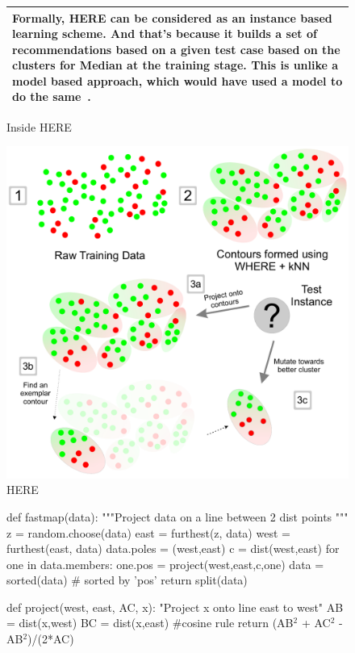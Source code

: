 \documentclass[conference]{IEEEtran}
\begin{document}
{\begin{figure}[htbp!]
\begin{tabular}{|p{.95\linewidth}|}
Formally, HERE can be considered as an instance based  learning scheme. And that's because it builds a set of recommendations based on a given test case based on the clusters for Median at the training stage. This is unlike a model based approach, which would have used a model to do the same~\cite{xomo}.
\\\hline
\end{tabular}
\caption{Inside HERE}\label{fig:what}
\end{figure}

\begin{figure}
\centering
\includegraphics[width=\linewidth]{_figs/WHAT-Clusters2.pdf}
\caption{HERE}
\label{fig:whatflow}
\end{figure}

\begin{figure}[!b]
\begin{python}[left]
def fastmap(data): 
  """Project data on a line 
     between 2 dist points
  """
  z          = random.choose(data)
  east       = furthest(z, data)
  west       = furthest(east, data)
  data.poles = (west,east)
  c          = dist(west,east)     
  for one in data.members: 
    one.pos = project(west,east,c,one)
  data = sorted(data) # sorted by 'pos'
  return split(data)

def project(west, east, AC, x): 
  "Project x onto line east to west"
  AB = dist(x,west)
  BC = dist(x,east)
  #cosine rule
  return (AB$^2$ + AC$^2$ - AB$^2$)/(2*AC) 


\end{python}
\end{figure}}
\end{document}
